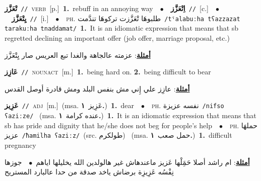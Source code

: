 \documentclass[10pt,a4paper,twoside]{article} %
\begin{document}
\begin{multicols}{2}
{\setlength\topsep{0pt}\textbf{\foreignlanguage{arabic}{تْعَزَّز}}\ {\color{gray}\texttt{//}\color{black}}\ \textsc{verb}\ [p.]\ \textbf{1.}~rebuff in an annoying way\ \ $\bullet$\ \ \setlength\topsep{0pt}\textbf{\foreignlanguage{arabic}{اِتْعَزَّز}}\ {\color{gray}\texttt{//}\color{black}}\ [c.]\ \ $\bullet$\ \ \setlength\topsep{0pt}\textbf{\foreignlanguage{arabic}{يِتْعَزَّز}}\ {\color{gray}\texttt{//}\color{black}}\ [i.]\ \ $\bullet$\ \ \textsc{ph.} \color{gray} \foreignlanguage{arabic}{طلبوهَا تْعَزَّزت تركوهَا تندَّمت}\color{black}\ {\color{gray}\texttt{/{\sffamily tˤalabuːha tʕazzazat tarakuːha tnaddamat}/}\color{black}}\ \textbf{1.}~It is an idiomatic expression that means that sb regretted declining an important offer (job offer, marriage proposal, etc.)\  \begin{flushright}\color{gray}\foreignlanguage{arabic}{\textbf{\underline{\foreignlanguage{arabic}{أمثلة}}}: عزمته عالجاهة والغدا تبع العريس صار يِتْعَزَّز}\end{flushright}\color{black}} \vspace{2mm}

{\setlength\topsep{0pt}\textbf{\foreignlanguage{arabic}{عَازِز}}\ {\color{gray}\texttt{//}\color{black}}\ \textsc{noun\textunderscore act}\ [m.]\ \textbf{1.}~being hard on.  \textbf{2.}~being difficult to bear\  \begin{flushright}\color{gray}\foreignlanguage{arabic}{\textbf{\underline{\foreignlanguage{arabic}{أمثلة}}}: عازِز علي إِني مش بنفس البلد ومش قادرة أوصل القدس}\end{flushright}\color{black}} \vspace{2mm}

{\setlength\topsep{0pt}\textbf{\foreignlanguage{arabic}{عَزِيز}}\ {\color{gray}\texttt{//}\color{black}}\ \textsc{adj}\ [m.]\ \color{gray}(msa. \foreignlanguage{arabic}{عَزِيز}~\foreignlanguage{arabic}{\textbf{١.}})\color{black}\ \textbf{1.}~dear\ \ $\bullet$\ \ \textsc{ph.} \color{gray} \foreignlanguage{arabic}{نفسه عزيزة}\color{black}\ {\color{gray}\texttt{/{\sffamily nifso ʕaziːze}/}\color{black}}\ \color{gray} (msa. \foreignlanguage{arabic}{عنده كرامة}~\foreignlanguage{arabic}{\textbf{١.}})\color{black}\ \textbf{1.}~It is an idiomatic expression that means that sb has pride and dignity that he/she does not beg for people's help\ \ $\bullet$\ \ \textsc{ph.} \color{gray} \foreignlanguage{arabic}{حملهَا عزيز}\color{black}\ {\color{gray}\texttt{/{\sffamily ħamilha ʕaziːz}/}\color{black}}\ \color{gray}(src. \foreignlanguage{arabic}{طولكرم})\color{black}\ \color{gray} (msa. \foreignlanguage{arabic}{حمل صعب}~\foreignlanguage{arabic}{\textbf{١.}})\color{black}\ \textbf{1.}~difficult pregnancy\  \begin{flushright}\color{gray}\foreignlanguage{arabic}{\textbf{\underline{\foreignlanguage{arabic}{أمثلة}}}: ام راشد أصلا حَمَِلْها عَزيز ماعندهاش غير هالولدين الله يخليلها اياهم\ $\bullet$\ \  جوزها نِفْسُه عَزِيزِة برضاش ياخد صدقة من حدا عالبارد المستريح}\end{flushright}\color{black}} \vspace{2mm}


\end{multicols}
\end{document}

